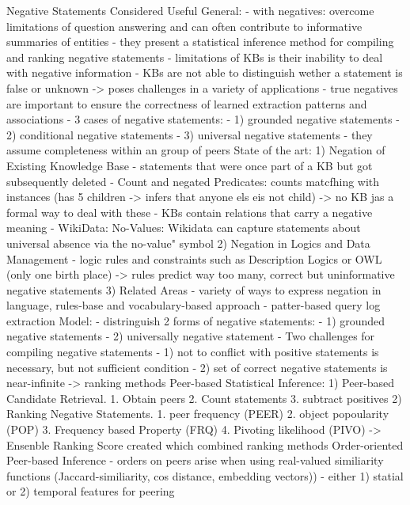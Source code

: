 \cite{arnaout2020negative}
Negative Statements Considered Useful
General:
    - with negatives: overcome limitations of question answering and can often contribute to informative summaries of entities
    - they present a statistical inference method for compiling and ranking negative statements
    - limitations of KBs is their inability to deal with negative information
    - KBs are not able to distinguish wether a statement is false or unknown -> poses challenges in a variety of applications
    - true negatives are important to ensure the correctness of learned extraction patterns and associations
    - 3 cases of negative statements:
    - 1) grounded negative statements
    - 2) conditional negative statements
    - 3) universal negative statements
    - they assume completeness within an group of peers
State of the art: 
    1) Negation of Existing Knowledge Base
    - statements that were once part of a KB but got subsequently deleted
    - Count and negated Predicates: counts matcfhing with instances (has 5 children -> infers that anyone els eis not child) -> no KB jas a formal way to deal with these
    - KBs contain relations that carry a negative meaning
    - WikiData: No-Values: Wikidata can capture statements about universal absence via the no-value" symbol
    2) Negation in Logics and Data Management
    - logic rules and constraints such as Description Logics or OWL (only one birth place)
    -> rules predict way too many, correct but uninformative negative statements
    3) Related Areas
    - variety of ways to express negation in language, rules-base and vocabulary-based approach
    - patter-based query log extraction
Model:
    - distringuish 2 forms of negative statements:
    - 1) grounded negative statements
    - 2) universally negative statement
    - Two challenges for compiling negative statements
    - 1) not to conflict with positive statements is necessary, but not sufficient condition
    - 2) set of correct negative statements is near-infinite -> ranking methods
Peer-based Statistical Inference:
    1) Peer-based Candidate Retrieval.
         1. Obtain peers 2. Count statements 3. subtract positives
    2) Ranking Negative Statements.
        1. peer frequency (PEER)
        2. object popoularity (POP)
        3. Frequency based Property (FRQ)
        4. Pivoting likelihood (PIVO)
        -> Ensenble Ranking Score created which combined ranking methods
Order-oriented Peer-based Inference
    - orders on peers arise when using real-valued similiarity functions (Jaccard-similiarity, cos distance, embedding vectors))
    - either 1) statial or 2) temporal features for peering
